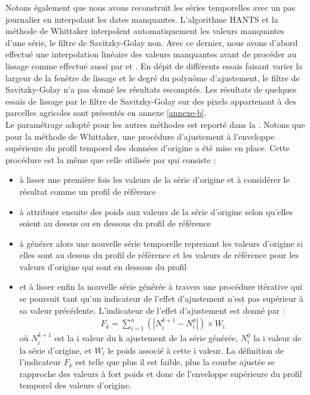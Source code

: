 Notons également que nous avons reconstruit les séries temporelles avec un pas journalier en interpolant les dates manquantes. L'algorithme HANTS et la méthode de Whittaker interpolent automatiquement les valeurs manquantes d'une série, le filtre de Savitzky-Golay non. Avec ce dernier, nous avons d'abord effectué une interpolation linéaire des valeurs manquantes avant de procéder au lissage comme effectué aussi par \citet{Chen2004} et \citet{Liu2017}. 
En dépit de différents essais faisant varier la largeur de la fenêtre de lissage et le degré du polynôme d'ajustement, le filtre de Savitzky-Golay n'a pas donné les résultats escomptés. Les résultats de quelques essais de lissage par le filtre de Savitzky-Golay sur des pixels appartenant à des parcelles agricoles sont présentés en annexe  \ref{annexe-b}.
\\Le paramétrage adopté pour les autres méthodes est reporté dans la . Notons que pour la méthode de Whittaker, une procédure d'ajustement à l'enveloppe supérieure du profil temporel des données d'origine a été mise en place. Cette procédure est la même que celle utilisée par \citet{Chen2004} qui consiste : 
\begin{itemize}
 \item à lisser une première fois les valeurs de la série d'origine et à considérer le résultat comme un profil de référence 
 \item à attribuer ensuite des poids aux valeurs de la série d'origine selon qu'elles soient au dessus ou en dessous du profil de référence
 \item à générer alors une nouvelle série temporelle reprenant les valeurs d'origine si elles sont au dessus du profil de référence et les valeurs de référence pour les valeurs d'origine qui sont en dessous du profil
 \item et à lisser enfin la nouvelle série générée à travers une procédure itérative qui se poursuit tant qu'un indicateur de l'effet d'ajustement n'est pas supérieur à sa valeur précédente. L'indicateur de l'effet d'ajustement est donné par :
 \begin{align}
   F_{k} = \sum_{i=1}^{n} (|N_{i}^{k+1} - N_{i}^{0}|) \times W_{i}
 \end{align}
 où $N_{i}^{k+1}$ est la i valeur du k ajustement de la série générée, $N_{i}^{0}$ la i valeur de la série d'origine, et $W_{i}$ le poids associé à cette i valeur. La définition de l'indicateur $F_{k}$ est telle que plus il est faible, plus la courbe ajustée se rapproche des valeurs à fort poids et donc de l'enveloppe supérieure du profil temporel des valeurs d'origine.
\end{itemize}

